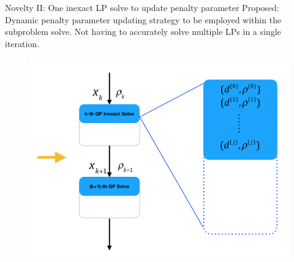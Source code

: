 \documentclass[8pt]{beamer}
\begin{document}
	\begin{frame}[c]{Novelty II: One inexact LP solve to update penalty parameter}
		\vfill
		{\red  \leftpointright Proposed: } 
		Dynamic penalty parameter updating strategy to be employed within the subproblem solve. Not having to accurately solve multiple LPs in a single iteration.
		\vfill
		\begin{figure}[H]
			\includegraphics[scale=0.15]{pic/dynamicupdate}
		\end{figure}
	\end{frame}
\end{document}
